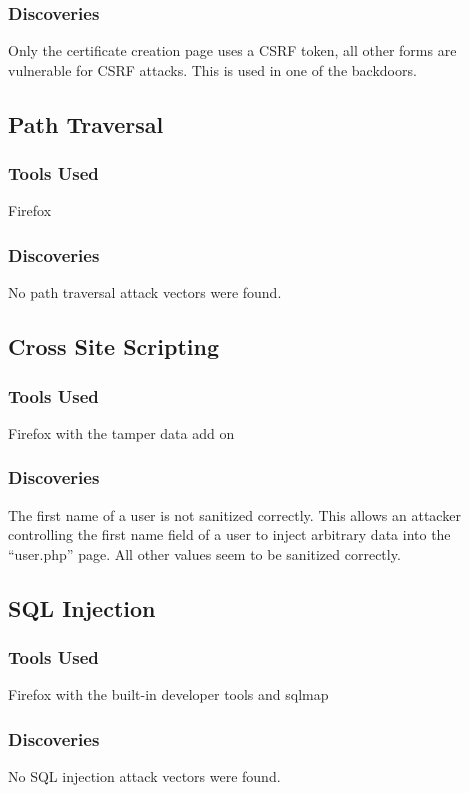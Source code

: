 \documentclass{article}
\begin{document}
\subsubsection{Discoveries}
Only the certificate creation page uses a CSRF token, all other forms are vulnerable for CSRF attacks. This is used in one of the backdoors.

\subsection{Path Traversal}
\subsubsection{Tools Used}
Firefox

\subsubsection{Discoveries}
No path traversal attack vectors were found.

\subsection{Cross Site Scripting }
\subsubsection{Tools Used}
Firefox with the tamper data add on

\subsubsection{Discoveries}
The first name of a user is not sanitized correctly. This allows an attacker controlling the first name field of a user to inject arbitrary data into the ``user.php'' page. All other values seem to be sanitized correctly.

\subsection{SQL Injection}
\subsubsection{Tools Used}
Firefox with the built-in developer tools and sqlmap

\subsubsection{Discoveries}
No SQL injection attack vectors were found.
\end{document}
